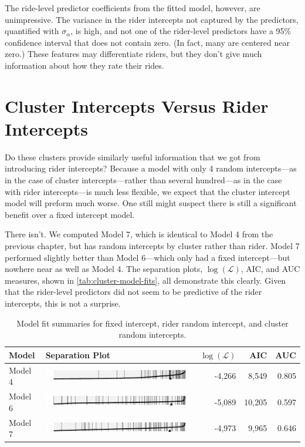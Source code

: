 \documentclass[12pt,twoside]{reedthesis}
\begin{document}
  The ride-level predictor coefficients from the fitted model, however,
  are unimpressive. The variance in the rider intercepts not captured by
  the predictors, quantified with \(\sigma_\alpha\), is high, and not one
  of the rider-level predictors have a 95\% confidence interval that does
  not contain zero. (In fact, many are centered near zero.) These features
  may differentiate riders, but they don't give much information about how
  they rate their rides.
  
  \section{Cluster Intercepts Versus Rider
  Intercepts}\label{cluster-intercepts-versus-rider-intercepts}
  
  Do these clusters provide similarly useful information that we got from
  introducing rider intercepts? Because a model with only 4 random
  intercepts---as in the case of cluster intercepts---rather than several
  hundred---as in the case with rider intercepts---is much less flexible,
  we expect that the cluster intercept model will preform much worse. One
  still might suspect there is still a significant benefit over a fixed
  intercept model.
  
  There isn't. We computed Model 7, which is identical to Model 4 from the
  previous chapter, but has random intercepts by cluster rather than
  rider. Model 7 performed slightly better than Model 6---which only had a
  fixed intercept---but nowhere near as well as Model 4. The separation
  plots, \(\log (\mathcal{L})\), AIC, and AUC measures, shown in
  \autoref{tab:cluster-model-fits}, all demonstrate this clearly. Given
  that the rider-level predictors did not seem to be predictive of the
  rider intercepts, this is not a surprise.
  
  \begin{table}[htb]
  \centering
  \caption{Model fit summaries for fixed intercept, rider random intercept, and
  cluster random intercepts.\label{tab:cluster-model-fits}}
  \begin{tabular}{lm{3in}rrr}
  \toprule
  \textbf{Model} & \textbf{Separation Plot} & \textbf{$\log (\mathcal{L})$} & \textbf{AIC} &
  \textbf{AUC}\footnotemark\\
  \midrule
  Model 4 & \includegraphics[width=3.1in]{figure/rider-model1-sep.pdf}
  & -4,266 & 8,549 & 0.805\\
  Model 6 & \includegraphics[width=3.1in]{figure/rider-model0-sep.pdf}
  & -5,089 & 10,205 & 0.597\\
  Model 7 & \includegraphics[width=3.1in]{figure/rider-model2-sep.pdf}
  & -4,973 & 9,965 & 0.646\\
  \bottomrule
  \end{tabular}
  \end{table}
  
\end{document}
